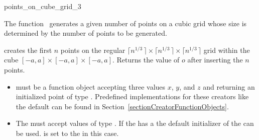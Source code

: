 \begin{ccRefFunction}{points_on_cube_grid_3}

\ccDefinition

The function \ccRefName\ generates a given number of points on a cubic
grid whose size is determined by the number of points to be generated.


\def\ccLongParamLayout{\ccTrue}
{ creates the first $n$ points on the regular $\lceil n^{1/3}\,\rceil
    \times \lceil  n^{1/3}\,\rceil \times \lceil  n^{1/3}\,\rceil$ 
    grid within the cube
    $[-a,a]\times [-a,a]\times [-a, a]$. Returns the value of $o$ after 
    inserting the $n$ points. 
}
\def\ccLongParamLayout{\ccFalse}

\ccRequirements
\begin{itemize}
    \item {} must be a function object accepting three
           values $x$, $y$,  and $z$ and returning an initialized 
           point  of type . Predefined implementations for 
           these creators like the default can be found in
           Section~\ref{sectionCreatorFunctionObjects}. 
    \item The  must accept values of type . If the
           has a  the default
          initializer of the  can be used.  is set to
          the  in this case.
\end{itemize}

 \\
 \\



\end{ccRefFunction}
